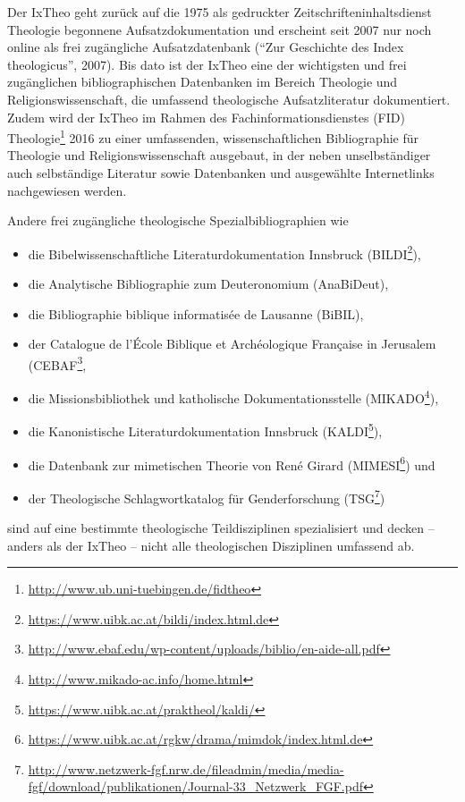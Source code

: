 \documentclass[a4paper,
fontsize=11pt,
oneside,
numbers=noperiodatend,
parskip=half-,
bibliography=totoc,
final
]{scrartcl}
\begin{document}
Der IxTheo geht zurück auf die 1975 als gedruckter
Zeitschrifteninhaltsdienst Theologie begonnene Aufsatzdokumentation und
erscheint seit 2007 nur noch online als frei zugängliche
Aufsatzdatenbank (\enquote{Zur Geschichte des Index theologicus}, 2007).
Bis dato ist der IxTheo eine der wichtigsten und frei zugänglichen
bibliographischen Datenbanken im Bereich Theologie und
Religionswissenschaft, die umfassend theologische Aufsatzliteratur
dokumentiert. Zudem wird der IxTheo im Rahmen des
Fachinformationsdienstes (FID) Theologie\footnote{\url{http://www.ub.uni-tuebingen.de/fidtheo}}
2016 zu einer umfassenden, wissenschaftlichen Bibliographie für
Theologie und Religionswissenschaft ausgebaut, in der neben
unselbständiger auch selbständige Literatur sowie Datenbanken und
ausgewählte Internetlinks nachgewiesen werden.

Andere frei zugängliche theologische Spezialbibliographien wie

\begin{itemize}
\item
  die Bibelwissenschaftliche Literaturdokumentation Innsbruck
  (BILDI\footnote{\url{https://www.uibk.ac.at/bildi/index.html.de}}),
\item
  die Analytische Bibliographie zum Deuteronomium (AnaBiDeut),
\item
  die Bibliographie biblique informatisée de Lausanne (BiBIL),
\item
  der Catalogue de l'École Biblique et Archéologique Française in
  Jerusalem (CEBAF\footnote{\url{http://www.ebaf.edu/wp-content/uploads/biblio/en-aide-all.pdf}},
\item
  die Missionsbibliothek und katholische Dokumentationsstelle
  (MIKADO\footnote{\url{http://www.mikado-ac.info/home.html}}),
\item
  die Kanonistische Literaturdokumentation Innsbruck (KALDI\footnote{\url{https://www.uibk.ac.at/praktheol/kaldi/}}),
\item
  die Datenbank zur mimetischen Theorie von René Girard
  (MIMESI\footnote{\url{https://www.uibk.ac.at/rgkw/drama/mimdok/index.html.de}})
  und
\item
  der Theologische Schlagwortkatalog für Genderforschung (TSG\footnote{\url{http://www.netzwerk-fgf.nrw.de/fileadmin/media/media-fgf/download/publikationen/Journal-33_Netzwerk_FGF.pdf}})
\end{itemize}

sind auf eine bestimmte theologische Teildisziplinen spezialisiert und
decken -- anders als der IxTheo -- nicht alle theologischen Disziplinen
umfassend ab.
\end{document}
